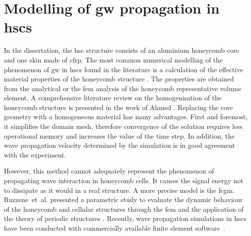 \section{Modelling of \acl{gw} propagation in \aclp{hsc}}
\label{sec:modelling}



In the dissertation, the \ac{hsc} structure consists of an aluminium honeycomb core and one skin made of \ac{cfrp}.
The most common numerical modelling of the phenomenon of \ac{gw} in \acp{hsc} found in the literature is a calculation of the effective material properties of the honeycomb structure \cite{baid2015dispersion, mustapha2014leaky, qi2008ultrasonic,  shi1995derivation, sikdar2016guided}.
The properties are obtained from the analytical \cite{gibson1982mechanics, malek2015effective} or the \ac{fem} \cite{catapano2014multi, chen2014analysis} analysis of the honeycomb representative volume element.
A comprehensive literature review on the homogenisation of the honeycomb structure is presented in the work of Ahmed \cite{ahmed2019homogenization}.
Replacing the core geometry with a homogeneous material has many advantages.
First and foremost, it simplifies the domain mesh, therefore convergence of the solution requires less operational memory and increases the value of the time step.
In addition, the wave propagation velocity determined by the simulation is in good agreement with the experiment.

However, this method cannot adequately represent the phenomenon of propagating wave interaction in honeycomb cells.
It causes the signal energy not to dissipate as it would in a real structure.
A more precise model is the \ac{fcgm}. 
Ruzzene~et~al. presented a parametric study to evaluate the dynamic behaviour of the honeycomb and cellular structures through the \ac{fem} and the application of the theory of periodic structures \cite{ruzzene2003wave}.
Recently, wave propagation simulations in \acp{hsc} have been conducted with commercially available finite element software~\cite{song2009guided, hosseini2013numerical, tian2015wavenumber, zhao2018wave}.

